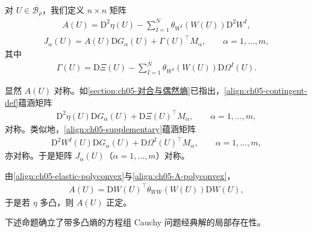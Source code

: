 \documentclass[../../main.tex]{subfiles}
\begin{document}
对 $U\in\overline{\mathscr{B}_{\rho}}$，我们定义 $n\times n$ 矩阵
\begin{align}
A(U)=\mathrm{D}^{2}\eta(U)-\sum_{I=1}^{N}\theta_{W^{I}}(W(U))\mathrm{D}^{2}W^{I},\label{align:ch05-A-polyconvex}
\end{align}
\begin{align}
J_{\alpha}(U)=A(U)\mathrm{D}G_{\alpha}(U)+\Gamma(U)^{\top}M_{\alpha},\qquad\alpha=1,\ldots,m,\label{align:ch05-Jalpha-polyconvex}
\end{align}
其中
\begin{align}
\Gamma(U)=\mathrm{D}\Xi(U)-\sum_{I=1}^{N}\theta_{W^{I}}(W(U))\mathrm{D}\Omega^{I}(U).\label{align:ch05-Gamma-def}
\end{align}

显然 $A(U)$ 对称。如\cref{section:ch05-对合与偶然熵}已指出，\eqref{align:ch05-contingent-def}蕴涵矩阵
\begin{align}
\mathrm{D}^{2}\eta(U)\mathrm{D}G_{\alpha}(U)+\mathrm{D}\Xi(U)^{\top}M_{\alpha},\qquad\alpha=1,\ldots,m,\label{align:ch05-sym1}
\end{align}
对称。类似地，\eqref{align:ch05-supplementary}蕴涵矩阵
\begin{align}
\mathrm{D}^{2}W^{I}(U)\mathrm{D}G_{\alpha}(U)+\mathrm{D}\Omega^{I}(U)^{\top}M_{\alpha},\qquad\alpha=1,\ldots,m,\label{align:ch05-sym2}
\end{align}
亦对称。于是矩阵 $J_{\alpha}(U)$（$\alpha=1,\ldots,m$）对称。

由\eqref{align:ch05-elastic-polyconvex}与\eqref{align:ch05-A-polyconvex}，
\begin{align}
A(U)=\mathrm{D}W(U)^{\top}\theta_{WW}(W(U))\mathrm{D}W(U),\label{align:ch05-A-factor}
\end{align}
于是若 $\eta$ 多凸，则 $A(U)$ 正定。

下述命题确立了带多凸熵的方程组 Cauchy 问题经典解的局部存在性。
\end{document}
